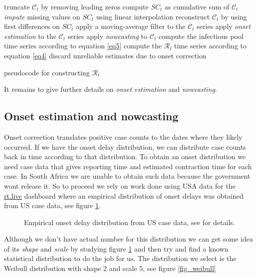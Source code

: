 \documentclass[11pt]{article}
\begin{document}
\begin{algorithm}[H]
 \Indp
truncate $\mathcal{C}_t$ by removing leading zeros\;
compute $SC_t$ as cumulative sum of $\mathcal{C}_t$\;
 {\it impute} missing values on $SC_t$ using linear interpolation\;
 reconstruct $\mathcal{C}_t$ by using first differences on $SC_t$\;
apply a moving-average filter to the $\mathcal{C}_t$ series\;
apply {\it onset estimation} to the $\mathcal{C}_t$ series\; 
apply {\it nowcasting} to $\mathcal{C}_t$\;
compute the infectious pool time series according to equation \ref{eq5}\;
compute the $\mathcal{R}_t$  time series according to equation \ref{eq4}\; 
discard unreliable estimates due to onset correction
\Indm
\label{alg1}
 \caption{pseudocode for constructing $\mathcal{R}_t$ }
\end{algorithm}

It remains to give further details on {\it onset estimation} and {\it nowcasting}.

\subsection{Onset estimation and nowcasting}

Onset correction translates positive case counts to the dates where they likely occurred. 
If we have the onset delay distribution, we can distribute case counts back in time 
according to that distribution. To obtain an onset distribution we need case data
that gives reporting time and estimated contraction time for each case.
In South Africa we are unable to obtain such data because the government wont
release it. So to proceed we rely on work done using USA data for the \url{rt.live} dashboard
where an empirical distribution of onset delays was obtained from US case data, 
see figure \ref{fig_empirical_onset_dist}.

\begin{figure}[H]
\begin{center}
\end{center}
\caption{Empirical onset delay distribution from US case data,  see \cite{systrom} for details.}  
\label{fig_empirical_onset_dist}
\end{figure}

Although we don't have actual number for this distribution we can get some idea of its {\it shape} and
{\it scale} by studying figure \ref{fig_empirical_onset_dist} and then try and find a known statistical
distribution to do the job for us. The distribution we select is the Weibull distribution with shape 2
and scale 5, see figure \ref{fig_weibull}
\end{document}
